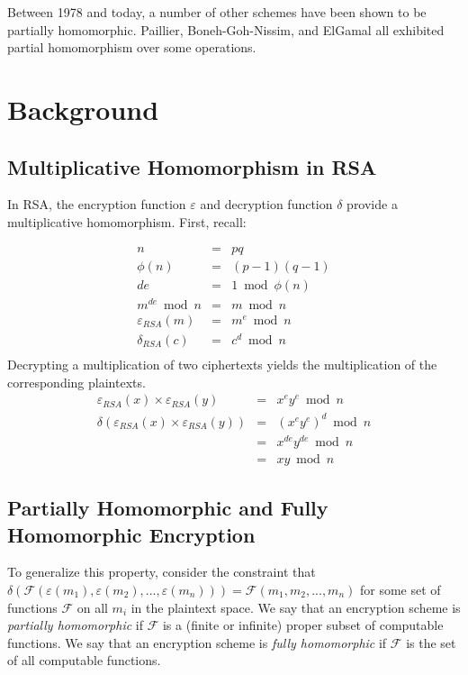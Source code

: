\documentclass[a4paper,10pt]{article}
\begin{document}
Between 1978 and today, a number of other schemes have been shown to
be partially homomorphic. Paillier, Boneh-Goh-Nissim, and ElGamal all
exhibited partial homomorphism over some operations.

\section{Background}

\subsection{Multiplicative Homomorphism in RSA}
In RSA, the encryption function $\varepsilon$ and decryption function
$\delta$ provide a multiplicative homomorphism. First, recall:

\begin{eqnarray*}
n &=& pq\\
\phi(n) &=& (p-1)(q-1)\\
de &=& 1 \bmod \phi(n)\\
m^{de} \bmod n &=& m \bmod n\\
\varepsilon_{RSA}(m) &=& m^e \bmod n\\
\delta_{RSA}(c) &=& c^d \bmod n\\
\end{eqnarray*}
Decrypting a multiplication of two ciphertexts yields the multiplication of the corresponding plaintexts.
\begin{eqnarray*}
\varepsilon_{RSA}(x) \times \varepsilon_{RSA}(y) &=& x^e y^e \bmod n\\
\delta(\varepsilon_{RSA}(x) \times \varepsilon_{RSA}(y)) &=& (x^e y^e)^d \bmod n\\
&=& x^{de} y^{de} \bmod n\\
&=& x y \bmod n
\end{eqnarray*}

\subsection{Partially Homomorphic and Fully Homomorphic Encryption}
To generalize this property, consider the constraint that
$\delta(\mathcal{F}(\varepsilon(m_1), \varepsilon(m_2), ...,
\varepsilon(m_n))) = \mathcal{F}(m_1, m_2, ..., m_n)$ for some set of
functions $\mathcal{F}$ on all $m_i$ in the plaintext space. We say
that an encryption scheme is \textit{partially homomorphic} if
$\mathcal{F}$ is a (finite or infinite) proper subset of computable
functions. We say that an encryption scheme is \textit{fully
  homomorphic} if $\mathcal{F}$ is the set of all computable
functions.
\end{document}
